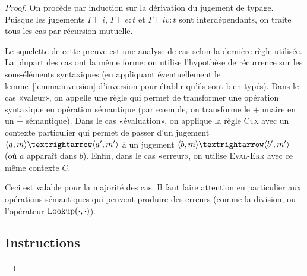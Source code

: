 \begin{proof}

On procède par induction sur la dérivation du jugement de typage. Puisque les
jugements $Γ ⊢ i$, $Γ ⊢ e : t$ et $Γ ⊢ lv : t$ sont interdépendants, on traite
tous les cas par récursion mutuelle.

Le squelette de cette preuve est une analyse de cas selon la dernière règle
utilisée. La plupart des cas ont la même forme: on utilise l'hypothèse de
récurrence sur les sous-éléments syntaxiques (en appliquant éventuellement le
lemme~\ref{lemma:inversion} d'inversion pour établir qu'ils sont bien typés).
Dans le cas «valeur», on appelle une règle qui permet de transformer une
opération syntaxique en opération sémantique (par exemple, on transforme le $+$
unaire en un $\widehat{+}$ sémantique). Dans le cas «évaluation», on applique
la règle \textsc{Ctx} avec un contexte particulier qui permet de passer d'un
jugement $\mm{m}{a}{m'}{a'}$ à un jugement $\mm{m}{b}{m'}{b'}$ (où $a$ apparaît
dans $b$). Enfin, dans le cas «erreur», on utilise \textsc{Eval-Err} avec ce
même contexte $C$.

Ceci est valable pour la majorité des cas. Il faut faire attention en
particulier aux opérations sémantiques qui peuvent produire des erreurs (comme
la division, ou l'opérateur $\mathrm{Lookup} (\cdot, \cdot)$).




\subsection{Instructions}


\end{proof}
